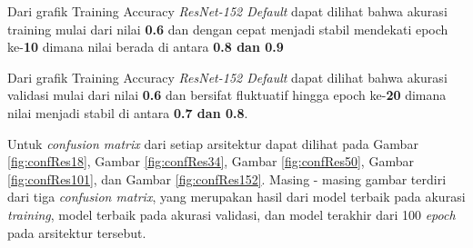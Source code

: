 Dari grafik Training Accuracy \emph{ResNet-152 Default} dapat dilihat bahwa akurasi training mulai dari nilai \textbf{0.6} dan dengan cepat menjadi stabil mendekati epoch ke-\textbf{10} dimana nilai berada di antara \textbf{0.8 dan 0.9} 

Dari grafik Training Accuracy \emph{ResNet-152 Default} dapat dilihat bahwa akurasi validasi mulai dari nilai \textbf{0.6} dan bersifat fluktuatif hingga epoch ke-\textbf{20} dimana nilai menjadi stabil di antara \textbf{0.7 dan 0.8}.

Untuk \emph{confusion matrix} dari setiap arsitektur dapat dilihat pada Gambar \ref{fig:confRes18}, Gambar \ref{fig:confRes34}, Gambar \ref{fig:confRes50}, Gambar \ref{fig:confRes101}, dan Gambar \ref{fig:confRes152}. Masing - masing gambar terdiri dari tiga \emph{confusion matrix}, yang merupakan hasil dari model terbaik pada akurasi \emph{training}, model terbaik pada akurasi validasi, dan model terakhir dari 100 \emph{epoch} pada arsitektur tersebut.
\pagebreak
